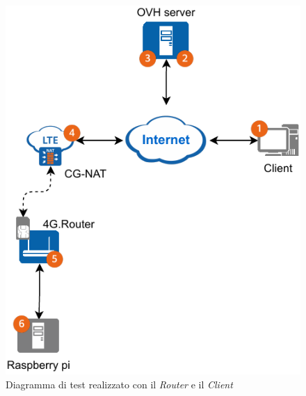 \begin{figure}[H]
    \centering
    \includegraphics[width=0.5\linewidth]{immagini/diag2-test_real}
    \caption{Diagramma di test realizzato con il \textit{Router} e il \textit{Client}}
    \label{fig:diag-test-real}
\end{figure}

